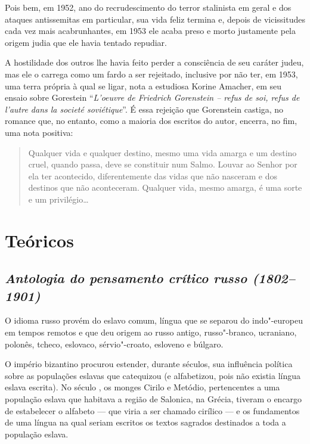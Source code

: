 {{{Pois bem, em 1952, ano do recrudescimento do terror stalinista em geral
e dos ataques antissemitas em particular, sua vida feliz termina e,
depois de vicissitudes cada vez mais acabrunhantes, em 1953 ele acaba
preso e morto justamente pela origem judia que ele havia tentado
repudiar.

A hostilidade dos outros lhe havia feito perder a consciência de seu
caráter judeu, mas ele o carrega como um fardo a ser rejeitado,
inclusive por não ter, em 1953, uma terra própria à qual se ligar, nota
a estudiosa Korine Amacher, em seu ensaio sobre Gorestein ``\emph{L'oeuvre de
Friedrich Gorenstein -- refus de soi, refus de l'autre dans la societé
soviétique}''. É essa rejeição que Gorenstein castiga, no romance que, no entanto, como a maioria dos escritos do autor, encerra,
no fim, uma nota positiva: 

\begin{quote}
Qualquer vida e qualquer destino, mesmo uma
vida amarga e um destino cruel, quando passa, deve se constituir num
Salmo. Louvar ao Senhor por ela ter acontecido, diferentemente das vidas
que não nasceram e dos destinos que não aconteceram. Qualquer vida,
mesmo amarga, é uma sorte e um privilégio\ldots{}
\end{quote}

\part{Teóricos}

\chapter{\emph{Antologia do pensamento crítico russo (1802--1901)}}

O idioma russo provém do eslavo comum, língua que se separou do
indo"-europeu em tempos remotos e que deu origem ao russo antigo,
russo"-branco, ucraniano, polonês, tcheco, eslovaco, sérvio"-croato,
esloveno e búlgaro.

O império bizantino procurou estender, durante séculos, sua influência
política sobre as populações eslavas que catequizou (e alfabetizou, pois
não existia língua eslava escrita). No século , os monges Cirilo e
Metódio, pertencentes a uma população eslava que habitava a região de
Salonica, na Grécia, tiveram o encargo de estabelecer o alfabeto --- que
viria a ser chamado cirílico --- e os fundamentos de uma língua na qual
seriam escritos os textos sagrados destinados a toda a população eslava.

}}}
